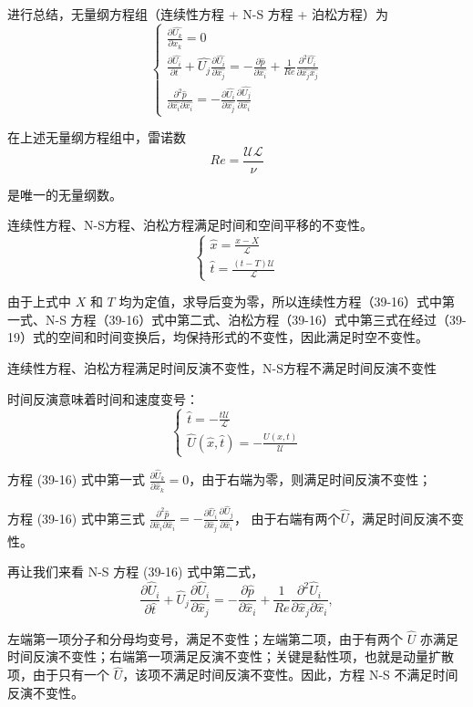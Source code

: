 \documentclass[12pt, a4paper, oneside, UTF8]{ctexbook}  %
\begin{document}
\begin{proposition}
进行总结，无量纲方程组（连续性方程 + N-S 方程 + 泊松方程）为
\[
\begin{cases}
\frac{\partial \hat{U_k}}{\partial x_k} = 0 \\
\frac{\partial \hat{U_i}}{\partial t} + \hat{U_j} \frac{\partial \hat{U_i}}{\partial \hat{x_j}} = -\frac{\partial \hat{p}}{\partial \hat{x_i}} + \frac{1}{Re} \frac{\partial^2 \hat{U_i}}{\partial \hat{x_j} \hat{x_j}} \\
\frac{\partial^2 \hat{p}}{\partial \hat{x_i} \partial \hat{x_i}} = -\frac{\partial \hat{U_i}}{\partial \hat{x_j}} \frac{\partial \hat{U_j}}{\partial \hat{x_i}}
\end{cases} \tag{39-16}
\]

在上述无量纲方程组中，雷诺数
\[
Re = \frac{\mathcal{U}\mathcal{L}}{\nu} \tag{39-17}
\]

是唯一的无量纲数。
\end{proposition}
\begin{proposition}
    连续性方程、N-S方程、泊松方程满足时间和空间平移的不变性。
    \[
    \begin{cases} 
    \hat{x} = \frac{x - X}{\mathcal{L}} \\ 
    \hat{t} = \frac{(t - T)\mathcal{U}}{\mathcal{L}}
    \end{cases} 
    \tag{39-19}
    \]
    
    由于上式中 \( X \) 和 \( T \) 均为定值，求导后变为零，所以连续性方程（39-16）式中第一式、N-S 方程（39-16）式中第二式、泊松方程（39-16）式中第三式在经过（39-19）式的空间和时间变换后，均保持形式的不变性，因此满足时空不变性。
\end{proposition}
\begin{proposition}
    连续性方程、泊松方程满足时间反演不变性，N-S方程不满足时间反演不变性

    时间反演意味着时间和速度变号：
\[
\begin{cases}
\hat{t} = -\frac{t\mathcal{U}}{\mathcal{L}} \\
\hat{U}(\hat{x}, \hat{t}) = -\frac{U(x, t)}{\mathcal{U}}
\end{cases}
\tag{39-20}
\]

方程 (39-16) 式中第一式 \(\frac{\partial \hat{U}_k}{\partial \hat{x}_k} = 0\)，由于右端为零，则满足时间反演不变性；

方程 (39-16) 式中第三式 \(\frac{\partial^2 \hat{p}}{\partial \hat{x}_i \partial \hat{x}_i} = -\frac{\partial \hat{U}_i}{\partial \hat{x}_j} \frac{\partial \hat{U}_j}{\partial \hat{x}_i}\)，
由于右端有两个$\hat{U}$，满足时间反演不变性。

再让我们来看 N-S 方程 (39-16) 式中第二式，
\[
\frac{\partial \hat{U}_i}{\partial \hat{t}} + \hat{U}_j \frac{\partial \hat{U}_i}{\partial \hat{x}_j} = -\frac{\partial \hat{p}}{\partial \hat{x}_i} + \frac{1}{Re} \frac{\partial^2 \hat{U}_i}{\partial \hat{x}_j \partial \hat{x}_i},
\]

左端第一项分子和分母均变号，满足不变性；左端第二项，由于有两个 \(\hat{U}\) 亦满足时间反演不变性；右端第一项满足反演不变性；关键是黏性项，也就是动量扩散项，由于只有一个 \(\hat{U}\)，该项不满足时间反演不变性。因此，方程 N-S 不满足时间反演不变性。
\end{proposition}
\end{document}
